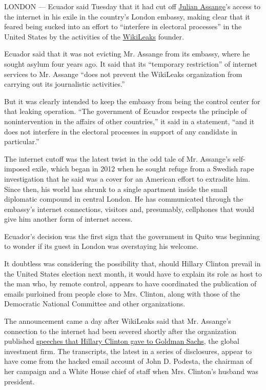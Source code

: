 LONDON --- Ecuador said Tuesday that it had cut off
\href{http://www.nytimes3xbfgragh.onion/topic/person/julian-assange?8qa}{Julian
Assange}'s access to the internet in his exile in the country's London
embassy, making clear that it feared being sucked into an effort to
``interfere in electoral processes'' in the United States by the
activities of the
\href{http://www.nytimes3xbfgragh.onion/topic/organization/wikileaks?8qa}{WikiLeaks}
founder.

Ecuador said that it was not evicting Mr. Assange from its embassy,
where he sought asylum four years ago. It said that its ``temporary
restriction'' of internet services to Mr. Assange ``does not prevent the
WikiLeaks organization from carrying out its journalistic activities.''

But it was clearly intended to keep the embassy from being the control
center for that leaking operation. ``The government of Ecuador respects
the principle of nonintervention in the affairs of other countries,'' it
said in a statement, ``and it does not interfere in the electoral
processes in support of any candidate in particular.''

The internet cutoff was the latest twist in the odd tale of Mr.
Assange's self-imposed exile, which began in 2012 when he sought refuge
from a Swedish rape investigation that he said was a cover for an
American effort to extradite him. Since then, his world has shrunk to a
single apartment inside the small diplomatic compound in central London.
He has communicated through the embassy's internet connections, visitors
and, presumably, cellphones that would give him another form of internet
access.

Ecuador's decision was the first sign that the government in Quito was
beginning to wonder if its guest in London was overstaying his welcome.

It doubtless was considering the possibility that, should Hillary
Clinton prevail in the United States election next month, it would have
to explain its role as host to the man who, by remote control, appears
to have coordinated the publication of emails purloined from people
close to Mrs. Clinton, along with those of the Democratic National
Committee and other organizations.

The announcement came a day after WikiLeaks said that Mr. Assange's
connection to the internet had been severed shortly after the
organization published
\href{http://www.nytimes3xbfgragh.onion/2016/10/16/us/politics/wikileaks-hack-hillary-clinton-emails.html}{speeches
that Hillary Clinton gave to Goldman Sachs}, the global investment firm.
The transcripts, the latest in a series of disclosures, appear to have
come from the hacked email account of John D. Podesta, the chairman of
her campaign and a White House chief of staff when Mrs. Clinton's
husband was president.

